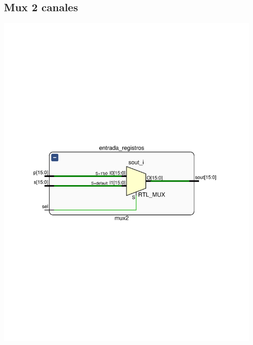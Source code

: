 \documentclass[8pt,executivepaper]{article}
\begin{document}
\subsection{Mux 2 canales}
\begin{center}
  \includegraphics[scale=0.5]{sources/schematicMux2.pdf}
\end{center}
\end{document}
